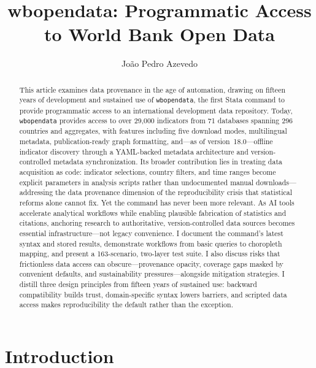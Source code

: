 \documentclass[bib]{statapress}
\title[Data Provenance in the Age of AI]{wbopendata: Programmatic Access to World Bank Open Data}
\author{Jo\~{a}o Pedro Azevedo}{%
Jo\~{a}o Pedro Azevedo\\
UNICEF\\
Division of Data, Analytics, Planning and Monitoring\\
3 United Nations Plaza\\
New York, NY 10017\\
jpazevedo@unicef.org%
}
\begin{document}
\maketitle

\begin{abstract}
This article examines data provenance in the age of automation, drawing on fifteen years of development and sustained use of \texttt{wbopendata}, the first Stata command to provide programmatic access to an international development data
repository. Today, \texttt{wbopendata} provides access to over 29{,}000 indicators from 71 databases spanning 296 countries and aggregates, with features including five download modes, multilingual metadata, publication-ready graph formatting, and---as of version~18.0---offline indicator discovery through a YAML-backed metadata architecture and version-controlled metadata synchronization. Its broader contribution lies in treating data acquisition as code: indicator selections, country filters, and time ranges become explicit parameters in analysis scripts rather than undocumented manual downloads---addressing the data provenance dimension of the reproducibility crisis that statistical reforms alone cannot fix. Yet the command has never been more relevant. As AI tools accelerate analytical workflows while enabling plausible fabrication of statistics and citations, anchoring research to authoritative, version-controlled data sources becomes essential infrastructure---not legacy convenience. I document the command's latest syntax and stored results, demonstrate workflows from basic queries to choropleth mapping, and present a 163-scenario, two-layer test suite. I also discuss risks that frictionless data access can obscure---provenance opacity, coverage gaps masked by convenient defaults, and sustainability pressures---alongside mitigation strategies. I distill three design principles from fifteen years of sustained use: backward compatibility builds trust, domain-specific syntax lowers barriers, and scripted data access makes reproducibility the default rather than the exception.

\end{abstract}



\section{Introduction}\label{sec:intro}
\end{document}
